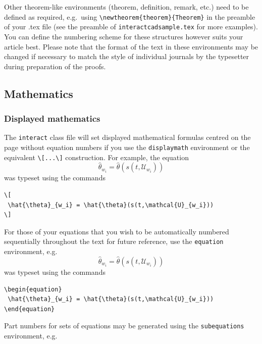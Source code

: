 \documentclass[]{interact}
\theoremstyle{plain}%
\theoremstyle{definition}
\theoremstyle{remark}
\begin{document}
Other theorem-like environments (theorem, definition, remark, etc.) need to be defined as required, e.g.~using \texttt{\textbackslash{}newtheorem\{theorem\}\{Theorem\}} in the preamble of your .tex file (see the preamble of \texttt{interactcadsample.tex} for more examples). You can define the numbering scheme for these structures however suits your article best. Please note that the format of the text in these environments may be changed if necessary to match the style of individual journals by the typesetter during preparation of the proofs.

\hypertarget{mathematics}{%
\subsection{Mathematics}\label{mathematics}}

\hypertarget{displayed-mathematics}{%
\subsubsection{Displayed mathematics}\label{displayed-mathematics}}

The \texttt{interact} class file will set displayed mathematical formulas centred on the page without equation numbers if you use the \texttt{displaymath} environment or the equivalent \texttt{\textbackslash{}{[}...\textbackslash{}{]}} construction. For example, the equation
\[
 \hat{\theta}_{w_i} = \hat{\theta}(s(t,\mathcal{U}_{w_i}))
\]
was typeset using the commands

\begin{verbatim}
\[
 \hat{\theta}_{w_i} = \hat{\theta}(s(t,\mathcal{U}_{w_i}))
\]
\end{verbatim}

For those of your equations that you wish to be automatically numbered sequentially throughout the text for future reference, use the \texttt{equation} environment, e.g.
\begin{equation}
 \hat{\theta}_{w_i} = \hat{\theta}(s(t,\mathcal{U}_{w_i}))
\end{equation}
was typeset using the commands

\begin{verbatim}
\begin{equation}
 \hat{\theta}_{w_i} = \hat{\theta}(s(t,\mathcal{U}_{w_i}))
\end{equation}
\end{verbatim}

Part numbers for sets of equations may be generated using the \texttt{subequations} environment, e.g.
\end{document}
